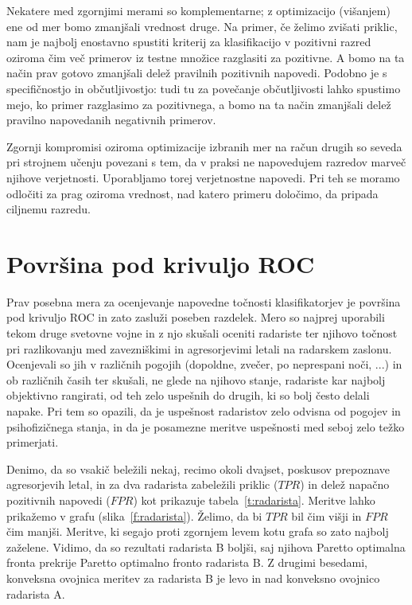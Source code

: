Nekatere med zgornjimi merami so komplementarne; z optimizacijo (višanjem) ene od mer bomo zmanjšali vrednost druge. Na primer, če želimo zvišati priklic, nam je najbolj enostavno spustiti kriterij za klasifikacijo v pozitivni razred oziroma čim več primerov iz testne množice razglasiti za pozitivne. A bomo na ta način prav gotovo zmanjšali delež pravilnih pozitivnih napovedi. Podobno je s specifičnostjo in občutljivostjo: tudi tu za povečanje občutljivosti lahko spustimo mejo, ko primer razglasimo za pozitivnega, a bomo na ta način zmanjšali delež pravilno napovedanih negativnih primerov.

Zgornji kompromisi oziroma optimizacije izbranih mer na račun drugih so seveda pri strojnem učenju povezani s tem, da v praksi ne napovedujem razredov marveč njihove verjetnosti. Uporabljamo torej verjetnostne napovedi. Pri teh se moramo odločiti za prag oziroma vrednost, nad katero primeru določimo, da pripada ciljnemu razredu.

\section{Površina pod krivuljo ROC}

Prav posebna mera za ocenjevanje napovedne točnosti klasifikatorjev je površina pod krivuljo ROC  in zato zasluži poseben razdelek. Mero so najprej uporabili tekom druge svetovne vojne in z njo skušali oceniti radariste ter njihovo točnost pri razlikovanju med zavezniškimi in agresorjevimi letali na radarskem zaslonu. Ocenjevali so jih v različnih pogojih (dopoldne, zvečer, po neprespani noči, ...) in ob različnih časih ter skušali, ne glede na njihovo stanje, radariste kar najbolj objektivno rangirati, od teh zelo uspešnih do drugih, ki so bolj često delali napake. Pri tem so opazili, da je uspešnost radaristov zelo odvisna od pogojev in psihofizičnega stanja, in da je posamezne meritve uspešnosti med seboj zelo težko primerjati.

Denimo, da so vsakič beležili nekaj, recimo okoli dvajset, poskusov prepoznave agresorjevih letal, in za dva radarista zabeležili priklic ($TPR$) in delež napačno pozitivnih napovedi ($FPR$) kot prikazuje tabela~\ref{t:radarista}. Meritve lahko prikažemo v grafu (slika~\ref{f:radarista}). Želimo, da bi $TPR$ bil čim višji in $FPR$ čim manjši. Meritve, ki segajo proti zgornjem levem kotu grafa so zato najbolj zaželene. Vidimo, da so rezultati radarista B boljši, saj njihova Paretto optimalna fronta prekrije Paretto optimalno fronto radarista B. Z drugimi besedami, konveksna ovojnica meritev za radarista B je levo in nad konveksno ovojnico radarista A.

